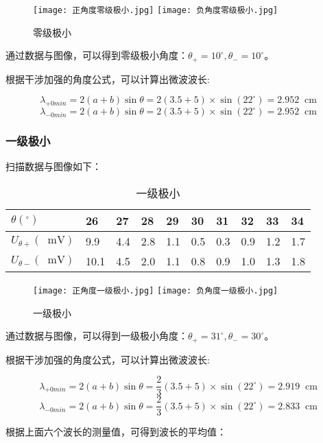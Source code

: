 \documentclass[11pt]{article}
\newcommand*{\unit}[1]{\mathop{}\!\mathrm{#1}}
\begin{document}
\begin{figure}[H]
  \centering
  \texttt{[image: 正角度零级极小.jpg]}
  \texttt{[image: 负角度零级极小.jpg]}
  \caption{零级极小}
\end{figure}

通过数据与图像，可以得到零级极小角度：$\theta_+ = 10^\circ, \theta_- = 10^\circ$。

根据干涉加强的角度公式，可以计算出微波波长:

\[\lambda_{+0min} = 2(a+b)\sin{\theta} = 2 (3.5+5)\times \sin{(22^\circ)}=2.952 \unit{cm}\]
\[\lambda_{-0min} = 2(a+b)\sin{\theta} = 2(3.5+5)\times \sin{(22^\circ)}=2.952 \unit{cm}\]

\subsubsection{一级极小}

扫描数据与图像如下：

\begin{table}[H]
  \centering
	\begin{tabular}{|l|l|l|l|l|l|l|l|l|l|}
		\hline
    $\theta(^\circ)$ &26    & 27    & 28    & 29    & 30    & 31    & 32    & 33    & 34   \\ \hline
		$U_{\theta+}(\unit{mV})$   &9.9   & 4.4   & 2.8   & 1.1   & 0.5   & 0.3   & 0.9   & 1.2   & 1.7   \\ \hline
		$U_{\theta-}(\unit{mV})$   &10.1  & 4.5   & 2.0   & 1.1   & 0.8   & 0.9   & 1.0   & 1.3   & 1.8    \\ \hline
  \end{tabular}
  \caption{一级极小}
\end{table}

\begin{figure}[H]
  \centering
  \texttt{[image: 正角度一级极小.jpg]}
  \texttt{[image: 负角度一级极小.jpg]}
  \caption{一级极小}
\end{figure}

通过数据与图像，可以得到一级极小角度：$\theta_+ = 31^\circ, \theta_- = 30^\circ$。

根据干涉加强的角度公式，可以计算出微波波长:

\[\lambda_{+0min} = 2(a+b)\sin{\theta} = \frac{2}{3} (3.5+5)\times \sin{(22^\circ)}=2.919 \unit{cm}\]
\[\lambda_{-0min} = 2(a+b)\sin{\theta} = \frac{2}{3} (3.5+5)\times \sin{(22^\circ)}=2.833 \unit{cm}\]

根据上面六个波长的测量值，可得到波长的平均值：
\end{document}
